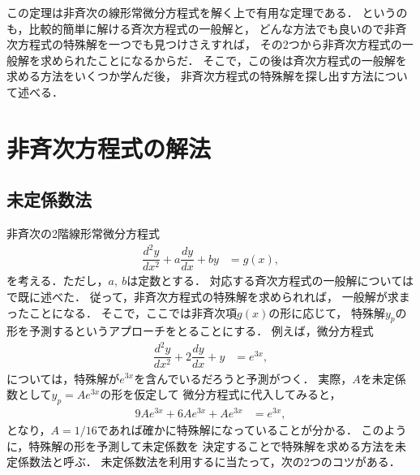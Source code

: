 この定理は非斉次の線形常微分方程式を解く上で有用な定理である．
というのも，比較的簡単に解ける斉次方程式の一般解と，
どんな方法でも良いので非斉次方程式の特殊解を一つでも見つけさえすれば，
その2つから非斉次方程式の一般解を求められたことになるからだ．
そこで，この後は斉次方程式の一般解を求める方法をいくつか学んだ後，
非斉次方程式の特殊解を探し出す方法について述べる．

%
%
\section{非斉次方程式の解法}
%
\subsection{未定係数法}
%
非斉次の2階線形常微分方程式
\begin{align}
\dfrac{d^{2}y}{dx^{2}}+a\dfrac{dy}{dx}+by & = g\left(x\right),
\label{eq:inhomo_linear2}
\end{align}
を考える．ただし，$a,~b$は定数とする．
対応する斉次方程式の一般解についてはで既に述べた．
従って，非斉次方程式の特殊解を求められれば，
一般解が求まったことになる．
そこで，ここでは非斉次項$g(x)$の形に応じて，
特殊解$y_p$の形を予測するというアプローチをとることにする．
例えば，微分方程式
\begin{align}
\dfrac{d^{2}y}{dx^{2}}+2\dfrac{dy}{dx}+y & =e^{3x},
\end{align}
については，特殊解が$e^{3x}$を含んでいるだろうと予測がつく．
実際，$A$を未定係数として$y_p = Ae^{3x}$の形を仮定して
微分方程式に代入してみると，
\begin{align}
9Ae^{3x}+6Ae^{3x}+Ae^{3x} & =e^{3x}, 
\end{align}
となり，$A=1/16$であれば確かに特殊解になっていることが分かる．
このように，特殊解の形を予測して未定係数を
決定することで特殊解を求める方法を未定係数法と呼ぶ．
未定係数法を利用するに当たって，次の2つのコツがある．

